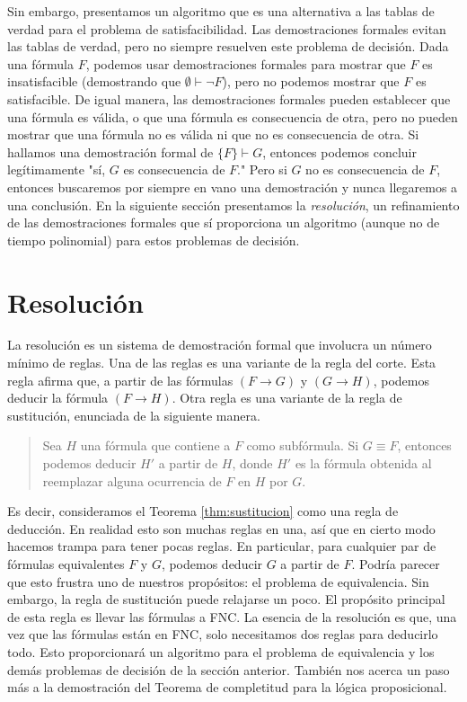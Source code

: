 \message{ !name(main.tex)}\documentclass[12pt,a4paper]{book}
\newcommand{\comillas}[1]{"#1"}
\begin{document}
    Sin embargo, presentamos un algoritmo que es una alternativa a las tablas de verdad para el problema de satisfacibilidad.
    Las demostraciones formales evitan las tablas de verdad, pero no siempre resuelven este problema de decisión. Dada una
    fórmula $F$, podemos usar demostraciones formales para mostrar que $F$ es insatisfacible (demostrando que
    $\emptyset\vdash\neg F$), pero no podemos mostrar que $F$ es satisfacible. De igual manera, las demostraciones formales
    pueden establecer que una fórmula es válida, o que una fórmula es consecuencia de otra, pero no pueden mostrar que una
    fórmula no es válida ni que no es consecuencia de otra. Si hallamos una demostración formal de $\{F\}\vdash G$, entonces
    podemos concluir legítimamente \comillas{sí, $G$ es consecuencia de $F$.} Pero si $G$ no es consecuencia de $F$,
    entonces buscaremos por siempre en vano una demostración y nunca llegaremos a una conclusión. En la siguiente sección
    presentamos la \textit{resolución}, un refinamiento de las demostraciones formales que sí proporciona un algoritmo
    (aunque no de tiempo polinomial) para estos problemas de decisión.

    \section{Resolución}

    La resolución es un sistema de demostración formal que involucra un número mínimo de reglas. Una de las reglas es una
    variante de la regla del corte. Esta regla afirma que, a partir de las fórmulas $(F\rightarrow G)$ y $(G\rightarrow H)$,
    podemos deducir la fórmula $(F\rightarrow H)$. Otra regla es una variante de la regla de sustitución, enunciada de la
    siguiente manera.

    \begin{quote}
        Sea $H$ una fórmula que contiene a $F$ como subfórmula. Si $G\equiv F$, entonces podemos deducir $H'$ a partir de $H$,
        donde $H'$ es la fórmula obtenida al reemplazar alguna ocurrencia de $F$ en $H$ por $G$.
    \end{quote}

    Es decir, consideramos el Teorema \ref{thm:sustitucion} como una regla de deducción. En realidad esto son muchas reglas
    en una, así que en cierto modo hacemos trampa para tener pocas reglas. En particular, para cualquier par de fórmulas
    equivalentes $F$ y $G$, podemos deducir $G$ a partir de $F$. Podría parecer que esto frustra uno de nuestros propósitos:
    el problema de equivalencia. Sin embargo, la regla de sustitución puede relajarse un poco. El propósito principal de esta
    regla es llevar las fórmulas a FNC. La esencia de la resolución es que, una vez que las fórmulas están en FNC, solo
    necesitamos dos reglas para deducirlo todo. Esto proporcionará un algoritmo para el problema de equivalencia y los demás
    problemas de decisión de la sección anterior. También nos acerca un paso más a la demostración del Teorema de
    completitud para la lógica proposicional.
\end{document}
